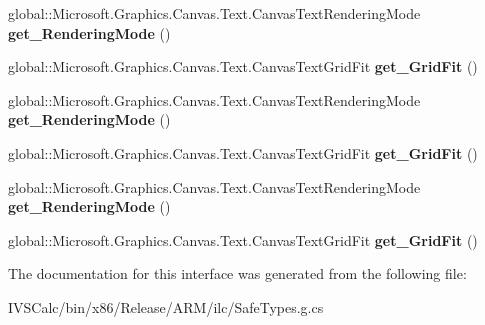 \begin{DoxyCompactItemize}
\item 
\mbox{\label{interface_microsoft_1_1_graphics_1_1_canvas_1_1_text_1_1_i_canvas_text_rendering_parameters_ae6aa9931921dbb57a98f0e348f4ae032}} 
global\+::\+Microsoft.\+Graphics.\+Canvas.\+Text.\+Canvas\+Text\+Rendering\+Mode {\bfseries get\+\_\+\+Rendering\+Mode} ()
\item 
\mbox{\label{interface_microsoft_1_1_graphics_1_1_canvas_1_1_text_1_1_i_canvas_text_rendering_parameters_af9621754fdbe97ea8a90094bbdea3e5b}} 
global\+::\+Microsoft.\+Graphics.\+Canvas.\+Text.\+Canvas\+Text\+Grid\+Fit {\bfseries get\+\_\+\+Grid\+Fit} ()
\item 
\mbox{\label{interface_microsoft_1_1_graphics_1_1_canvas_1_1_text_1_1_i_canvas_text_rendering_parameters_ae6aa9931921dbb57a98f0e348f4ae032}} 
global\+::\+Microsoft.\+Graphics.\+Canvas.\+Text.\+Canvas\+Text\+Rendering\+Mode {\bfseries get\+\_\+\+Rendering\+Mode} ()
\item 
\mbox{\label{interface_microsoft_1_1_graphics_1_1_canvas_1_1_text_1_1_i_canvas_text_rendering_parameters_af9621754fdbe97ea8a90094bbdea3e5b}} 
global\+::\+Microsoft.\+Graphics.\+Canvas.\+Text.\+Canvas\+Text\+Grid\+Fit {\bfseries get\+\_\+\+Grid\+Fit} ()
\item 
\mbox{\label{interface_microsoft_1_1_graphics_1_1_canvas_1_1_text_1_1_i_canvas_text_rendering_parameters_ae6aa9931921dbb57a98f0e348f4ae032}} 
global\+::\+Microsoft.\+Graphics.\+Canvas.\+Text.\+Canvas\+Text\+Rendering\+Mode {\bfseries get\+\_\+\+Rendering\+Mode} ()
\item 
\mbox{\label{interface_microsoft_1_1_graphics_1_1_canvas_1_1_text_1_1_i_canvas_text_rendering_parameters_af9621754fdbe97ea8a90094bbdea3e5b}} 
global\+::\+Microsoft.\+Graphics.\+Canvas.\+Text.\+Canvas\+Text\+Grid\+Fit {\bfseries get\+\_\+\+Grid\+Fit} ()
\end{DoxyCompactItemize}


The documentation for this interface was generated from the following file\+:\begin{DoxyCompactItemize}
\item 
I\+V\+S\+Calc/bin/x86/\+Release/\+A\+R\+M/ilc/Safe\+Types.\+g.\+cs\end{DoxyCompactItemize}
